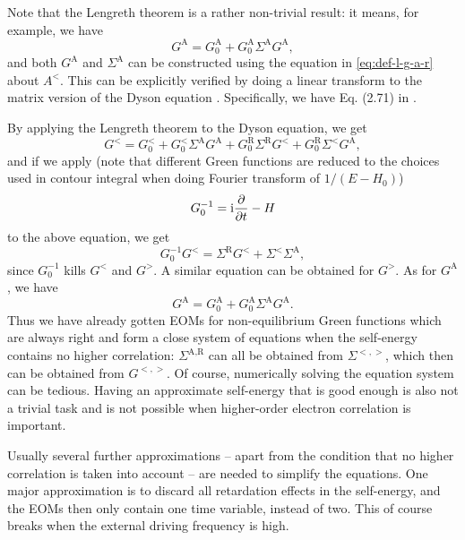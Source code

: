 \documentclass[hyperref, a4paper]{article}
\newcommand*{\ii}{\mathrm{i}}
\begin{document}
Note that the Lengreth theorem is a rather non-trivial result: 
it means, for example, we have 
\begin{equation}
    G^{\text{A}} = G_0^{ \text{A}} + G_0^{ \text{A}} \Sigma^{\text{A}} G^{\text{A}},
\end{equation}
and both $G^{\text{A}}$ and $\Sigma^{\text{A}}$
can be constructed using the equation in \eqref{eq:def-l-g-a-r} about $A^<$.
This can be explicitly verified by 
doing a linear transform to the matrix version of the Dyson equation 
\cite{rammer1986quantum}.
Specifically, we have Eq. (2.71) in \cite{rammer1986quantum}.

By applying the Lengreth theorem to the Dyson equation, we get 
\cite{rammer1986quantum,vspivcka2005long}
\begin{equation}
    G^< = G^<_0 + G^<_0 \Sigma^{\text{A}} G^{\text{A}}
    + G_0^{\text{R}} \Sigma^{\text{R}} G^< 
    + G_0^{\text{R}} \Sigma^{<} G^\text{A} ,
\end{equation}
and if we apply (note that different Green functions are reduced to 
the choices used in contour integral when doing Fourier transform of $1 / (E - H_0)$)
\begin{equation}
    G_0^{-1} = \ii \pdv{t} - H
\end{equation}
to the above equation, we get 
\begin{equation}
    G_0^{-1} G^< = \Sigma^{\text{R}} G^< + \Sigma^< \Sigma^{\text{A}},
\end{equation}
since $G_0^{-1}$ kills $G^<$ and $G^>$.
A similar equation can be obtained for $G^>$.
As for $G^{\text{A}}$, we have 
\begin{equation}
    G^{\text{A}} = G^{\text{A}}_0 + G^{\text{A}}_0 \Sigma^{\text{A}} G^{\text{A}}.
\end{equation}
Thus we have already gotten EOMs for non-equilibrium Green functions 
which are always right
and form a close system of equations
when the self-energy contains no higher correlation: 
$\Sigma^{\text{A}, \text{R}}$ can all be obtained from $\Sigma^{<,>}$,
which then can be obtained from $G^{<, >}$.
Of course, numerically solving the equation system can be tedious. 
Having an approximate self-energy that is good enough
is also not a trivial task and is not possible 
when higher-order electron correlation is important.

Usually several further approximations -- apart from 
the condition that no higher correlation is taken into account --
are needed to simplify the equations.
One major approximation is to discard all retardation effects in the self-energy,
and the EOMs then only contain one time variable,
instead of two.
This of course breaks when the external driving frequency is high.
\end{document}
